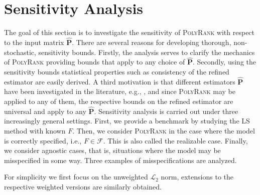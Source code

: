\documentclass[twoside,11pt]{article}
\begin{document}
 

\section{Sensitivity Analysis}
\label{sec:sensitivity_analysis}

The goal of this section is to  investigate the sensitivity of \textsc{PolyRank} with respect to the input matrix $\boldsymbol{\hat{P}}$. There are several reasons for developing thorough, non-stochastic, sensitivity bounds. Firstly, the analysis serves to clarify the mechanics of \textsc{PolyRank} providing bounds that apply to any choice of $\boldsymbol{\hat{P}}$. Secondly, using the sensitivity bounds statistical properties such as consistency of the refined estimator are easily derived. A third motivation is that different estimators $\boldsymbol{\hat P}$ have been investigated in the literature, e.g., \citet{rajkumar,chatterjee,shah}, and since \textsc{PolyRank} may be applied to any of them, the respective bounds on the refined estimator are universal and apply to any $\boldsymbol{\hat P}$. Sensitivity analysis is carried out under three increasingly general settings. First, we provide a benchmark by studying the LS method with known $F$. Then, we consider \textsc{PolyRank} in the case where the model is correctly specified, i.e., $F \in \mathcal{F}$. This is also called the realizable case. Finally, we consider agnostic cases, that is, situations where the model may be misspecified in some way. Three  examples of misspecifications are analyzed. 

For simplicity we first focus on the unweighted $\mathcal{L}_2$ norm, extensions to the respective weighted versions are similarly obtained.  
\end{document}
